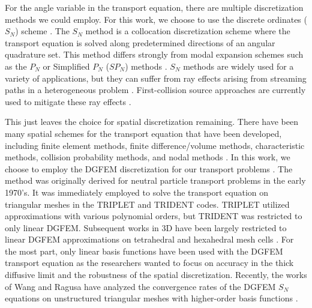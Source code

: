 For the angle variable in the transport equation, there are multiple discretization methods we could employ. For this work, we choose to use the discrete ordinates ($S_N$) scheme \cite{carlson1968computing,lewis1984computational}. The $S_N$ method is a collocation discretization scheme where the transport equation is solved along predetermined directions of an angular quadrature set. This method differs strongly from modal expansion schemes such as the $P_N$ or Simplified $P_N$ ($SP_N$) methods \cite{bell1979nuclear,gelbard1960application}. $S_N$ methods are widely used for a variety of applications, but they can suffer from ray effects arising from streaming paths in a heterogeneous problem \cite{lathrop1968ray}. First-collision source approaches are currently used to mitigate these ray effects \cite{lathrop1971remedies,morel_rayeffects}.

This just leaves the choice for spatial discretization remaining. There have been many spatial schemes for the transport equation that have been developed, including finite element methods, finite difference/volume methods, characteristic methods, collision probability methods, and nodal methods \cite{reed1973triangularmesh,bell1979nuclear,morel1999self,askew1972characteristics,alcouffe1981review,sanchez1982review}. In this work, we choose to employ the DGFEM discretization for our transport problems \cite{reed1973triangularmesh,lesaint1974finite}. The method was originally derived for neutral particle transport problems in the early 1970's. It was immediately employed to solve the transport equation on triangular meshes in the TRIPLET \cite{reed1973triplet} and TRIDENT \cite{seed1977trident,seed1978trident} codes. TRIPLET utilized approximations with various polynomial orders, but TRIDENT was restricted to only linear DGFEM. Subsequent works in 3D have been largely restricted to linear DGFEM approximations on tetrahedral and hexahedral mesh cells \cite{wareing2001discontinuous,morel2005s}. For the most part, only linear basis functions have been used with the DGFEM transport equation as the researchers wanted to focus on accuracy in the thick diffusive limit and the robustness of the spatial discretization. Recently, the works of Wang and Ragusa have analyzed the convergence rates of the DGFEM $S_N$ equations on unstructured triangular meshes with higher-order basis functions \cite{wang2009convergence,wang2009high}.


